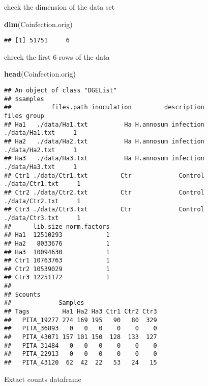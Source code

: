 \documentclass[
]{article}
\newenvironment{Shaded}{\begin{snugshade}}{\end{snugshade}}
\newcommand{\FunctionTok}[1]{\textcolor[rgb]{0.13,0.29,0.53}{\textbf{#1}}}
\newcommand{\NormalTok}[1]{#1}
\newcommand{\OtherTok}[1]{\textcolor[rgb]{0.56,0.35,0.01}{#1}}
\newcommand{\SpecialCharTok}[1]{\textcolor[rgb]{0.81,0.36,0.00}{\textbf{#1}}}
\begin{document}
check the dimension of the data set

\begin{Shaded}
\begin{Highlighting}[]
\FunctionTok{dim}\NormalTok{(Coinfection.orig)}
\end{Highlighting}
\end{Shaded}

\begin{verbatim}
## [1] 51751     6
\end{verbatim}

chreck the first 6 rows of the data

\begin{Shaded}
\begin{Highlighting}[]
\FunctionTok{head}\NormalTok{(Coinfection.orig)}
\end{Highlighting}
\end{Shaded}

\begin{verbatim}
## An object of class "DGEList"
## $samples
##           files.path inoculation         description           files group
## Ha1   ./data/Ha1.txt          Ha H.annosum infection  ./data/Ha1.txt     1
## Ha2   ./data/Ha2.txt          Ha H.annosum infection  ./data/Ha2.txt     1
## Ha3   ./data/Ha3.txt          Ha H.annosum infection  ./data/Ha3.txt     1
## Ctr1 ./data/Ctr1.txt         Ctr             Control ./data/Ctr1.txt     1
## Ctr2 ./data/Ctr2.txt         Ctr             Control ./data/Ctr2.txt     1
## Ctr3 ./data/Ctr3.txt         Ctr             Control ./data/Ctr3.txt     1
##      lib.size norm.factors
## Ha1  12510293            1
## Ha2   8033676            1
## Ha3  10094630            1
## Ctr1 10763763            1
## Ctr2 10539029            1
## Ctr3 12251172            1
## 
## $counts
##             Samples
## Tags         Ha1 Ha2 Ha3 Ctr1 Ctr2 Ctr3
##   PITA_19277 274 169 195   90   80  329
##   PITA_36893   0   0   0    0    0    0
##   PITA_43071 157 101 150  128  133  127
##   PITA_31484   0   0   0    0    0    0
##   PITA_22913   0   0   0    0    0    0
##   PITA_43120  62  42  22   53   24   15
\end{verbatim}

Extact counts dataframe

\begin{Shaded}
\end{Shaded}
\end{document}
